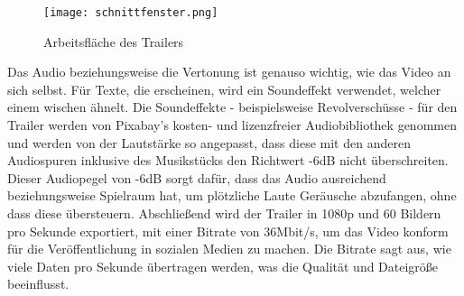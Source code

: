 \begin{figure}[H]
\centering
\texttt{[image: schnittfenster.png]}
\caption{Arbeitsfläche des Trailers}
\end{figure}

Das Audio beziehungsweise die Vertonung ist genauso wichtig, wie das Video an sich selbst.
Für Texte, die erscheinen, wird ein Soundeffekt verwendet, welcher einem wischen ähnelt.
Die Soundeffekte - beispielsweise Revolverschüsse - für den Trailer werden von Pixabay’s kosten- und lizenzfreier Audiobibliothek genommen und werden von der
Lautstärke so angepasst, dass diese mit den anderen Audiospuren inklusive des Musikstücks den Richtwert -6dB nicht überschreiten.
Dieser Audiopegel von -6dB sorgt dafür, dass das Audio ausreichend  beziehungsweise Spielraum
hat, um plötzliche Laute Geräusche abzufangen, ohne dass diese übersteuern. 
Abschließend wird der Trailer in 1080p und 60 Bildern pro Sekunde exportiert, mit einer Bitrate von 36Mbit/s, um das Video konform für die Veröffentlichung in sozialen Medien zu machen.
Die Bitrate sagt aus, wie viele Daten pro Sekunde übertragen werden, was die Qualität und Dateigröße beeinflusst. 



\renewcommand{\kapitelautor}{}
